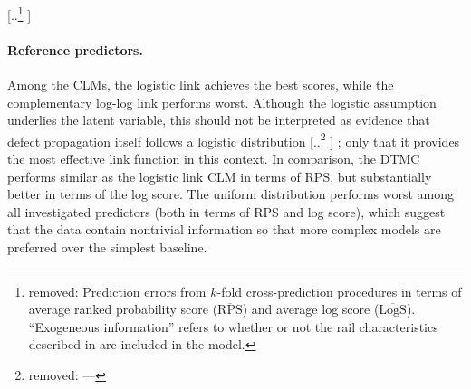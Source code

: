 \documentclass{article}
\providecommand{\DIFadd}[1]{{\protect\color{blue} \sf #1}} %
\providecommand{\DIFdel}[1]{{\protect\color{red} [..\footnote{removed: #1} ]}} %
\providecommand{\DIFaddbegin}{} %
\providecommand{\DIFaddend}{} %
\providecommand{\DIFdelbegin}{} %
\providecommand{\DIFdelend}{} %
\providecommand{\DIFdelFL}[1]{\DIFdel{#1}} %
\begin{document}
\DIFdelbegin %
{%
\DIFdelFL{Prediction errors from $k$-fold cross-prediction procedures in terms of average ranked probability score ($\overline{\text{RPS}}$) and average log score ($\overline{\text{LogS}}$). ``Exogeneous information'' refers to whether or not the rail characteristics described in \Cref{sec:data} are included in the model.}}
\DIFdelend \DIFaddbegin 
\DIFaddend 


\DIFaddbegin \paragraph{\DIFadd{Reference predictors.}}
\DIFaddend Among the CLMs, the logistic link achieves the best scores, while the complementary log-log link performs worst. Although the logistic assumption underlies the latent variable, this should not be interpreted as evidence that defect propagation itself follows a logistic distribution\DIFdelbegin \DIFdel{—}\DIFdelend \DIFaddbegin \DIFadd{; }\DIFaddend only that it provides the most effective link function in this context. 
\DIFaddbegin \DIFadd{In comparison, the DTMC performs similar as the logistic link CLM in terms of RPS, but substantially better in terms of the log score.
The uniform distribution performs worst among all investigated predictors (both in terms of RPS and log score), which suggest that the data contain nontrivial information so that more complex models are preferred over the simplest baseline. 
}\DIFaddend 
\end{document}
